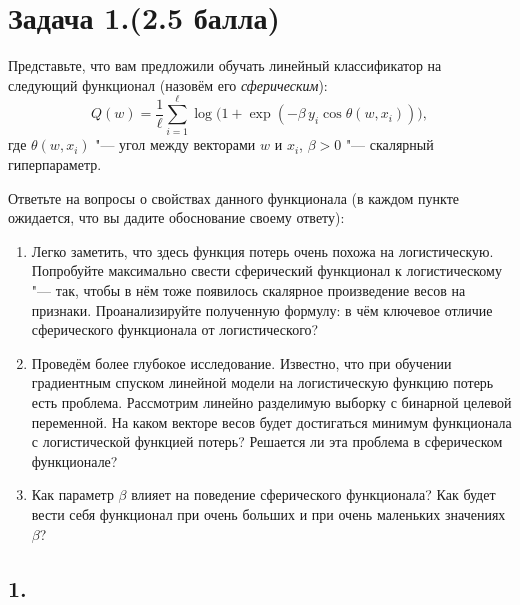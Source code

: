 \documentclass[12pt,a4paper]{article}
\begin{document}

\section*{Задача 1.(2.5 балла)}

Представьте, что вам предложили обучать линейный классификатор на следующий
функционал (назовём его \emph{сферическим}):
\[
Q(w) = \frac{1}{\ell}\sum_{i=1}^{\ell}
\log\bigl(1 + \exp(-\beta\, y_i \cos\theta(w, x_i))\bigr),
\]
где $\theta(w, x_i)$ "--- угол между векторами $w$ и $x_i$,
$\beta > 0$ "--- скалярный гиперпараметр.

Ответьте на вопросы о свойствах данного функционала (в каждом пункте
ожидается, что вы дадите обоснование своему ответу):

\begin{enumerate}
    \item Легко заметить, что здесь функция потерь очень похожа на
    логистическую. Попробуйте максимально свести сферический функционал
    к логистическому "--- так, чтобы в нём тоже появилось скалярное
    произведение весов на признаки. Проанализируйте полученную формулу:
    в чём ключевое отличие сферического функционала от логистического?

    \item Проведём более глубокое исследование. Известно, что при обучении
    градиентным спуском линейной модели на логистическую функцию потерь
    есть проблема. Рассмотрим линейно разделимую выборку с бинарной
    целевой переменной. На каком векторе весов будет достигаться минимум
    функционала с логистической функцией потерь? Решается ли эта
    проблема в сферическом функционале?

    \item Как параметр $\beta$ влияет на поведение сферического
    функционала? Как будет вести себя функционал при очень больших и при
    очень маленьких значениях $\beta$?
\end{enumerate}

\subsection*{1.}
\end{document}
